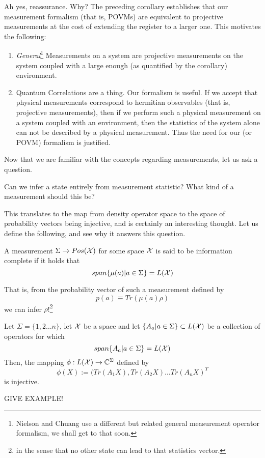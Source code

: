 \begin{pfact}
Ah yes, reassurance. Why? The preceding corollary establishes that our measurement formalism (that is, POVMs) are equivalent to projective measurements at the cost of extending the register to a larger one. This motivates the following:
\begin{enumerate}
    \item \textit{General}\footnote{Nielson and Chuang use a different but related general measurement operator formalism, we shall get to that soon.} Measurements on a system are projective measurements on the system coupled with a large enough (as quantified by the corollary) environment.
    \item Quantum Correlations are a thing. Our formalism is useful. If we accept that physical measurements correspond to hermitian observables (that is, projective measurements), then if we perform such a physical measurement on a system coupled with an environment, then the statistics of the system alone can not be described by a physical measurement. Thus the need for our (or POVM) formalism is justified.
\end{enumerate}

\end{pfact}
Now that we are familiar with the concepts regarding measurements, let us ask a question.
\begin{center}
    Can we infer a state entirely from measurement statistic? What kind of a measurement should this be?
\end{center}
This translates to the map from density operator space to the space of probability vectors being injective, and is certainly an interesting thought. Let us define the following, and see why it answers this question.
\begin{definition}
A measurement $\Sigma\to Pos(\mathcal{X})$ for some space $\mathcal{X}$ is said to be information complete if it holds that 
\[span\{\mu(a)|a\in\Sigma\} = L(\mathcal{X})\]
\end{definition}
That is, from the probability vector of such a measurement defined by 
\[p(a) \equiv Tr(\mu(a)\rho)\]
we can infer $\rho$!\footnote{in the sense that no other state can lead to that statistics vector.}
\begin{lemma}
Let $\Sigma = \{1,2\dots n\}$, let $\mathcal{X}$ be a space and let $\{A_a|a\in\Sigma\} \subset L(\mathcal{X})$ be a collection of operators for which 
\[span\{A_a|a\in\Sigma\} = L(\mathcal{X})\]
Then, the mapping $\phi:L(\mathcal{X})\to\mathbb{C}^{\Sigma}$ defined by 
\[\phi(X) := (Tr(A_1X),Tr(A_2X)\dots Tr(A_nX)^T\]
is injective. 
\end{lemma}
GIVE EXAMPLE!
